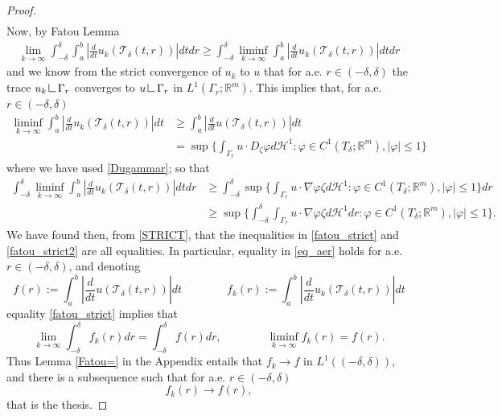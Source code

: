 \documentclass[a4paper,11pt]{article}
\numberwithin{equation}{section}
\newcommand{\R}{\mathbb{R}}
\newcommand{\res}      {\mathop{\hbox{\vrule height 7pt width .5pt depth
                        0pt\vrule height .5pt width 6pt depth 0pt}}\nolimits}
\begin{document}
\begin{proof}
\begin{align}
\end{align}
Now, by Fatou Lemma
\begin{align}\label{fatou_strict}
	\lim_{k\rightarrow \infty}\int_{-\delta}^\delta\int_{a}^b|\frac{d}{dt}u_k(\mathcal T_\delta(t,r))|dtdr\geq \int_{-\delta}^\delta\liminf_{k\rightarrow \infty}\int_{a}^b|\frac{d}{dt}u_k(\mathcal T_\delta(t,r))|dtdr
\end{align}
and we know from the strict convergence of $u_k$ to $u$ that for a.e. $r\in (-\delta,\delta)$ the trace $u_k\res\Gamma_r$ converges to $u\res\Gamma_r$ in $L^1(\Gamma_r;\R^m)$. This implies that, for a.e. $r\in (-\delta,\delta)$ 
\begin{align}\label{eq_aer}
\liminf_{k\rightarrow \infty}\int_{a}^b|\frac{d}{dt}u_k(\mathcal T_\delta(t,r))|dt&\geq \int_{a}^b|\frac{d}{dt}u(\mathcal T_\delta(t,r))|dt\nonumber\\
&=\sup\{\int_{\Gamma_r}u\cdot D_\zeta\varphi d\mathcal H^1:\varphi\in C^1(T_\delta;\R^m),|\varphi|\leq 1\}
\end{align}
where we have used \eqref{Dugammar}; so that 
\begin{align}\label{fatou_strict2}
\int_{-\delta}^\delta\liminf_{k\rightarrow \infty}\int_{a}^b|\frac{d}{dt}u_k(\mathcal T_\delta(t,r))|dtdr&\geq \int_{-\delta}^\delta \sup\{\int_{\Gamma_r}u\cdot\nabla\varphi\zeta d\mathcal H^1:\varphi\in C^1(T_\delta;\R^m),|\varphi|\leq 1\}dr\nonumber\\
&\geq \sup \{\int_{-\delta}^\delta\int_{\Gamma_r}u\cdot\nabla\varphi\zeta d\mathcal H^1dr:\varphi\in C^1(T_\delta;\R^m),|\varphi|\leq 1\}.
\end{align}
We have found then, from \eqref{STRICT}, that the inequalities in \eqref{fatou_strict}  and \eqref{fatou_strict2} are all equalities. In particular, equality in \eqref{eq_aer} holds for a.e. $r\in (-\delta,\delta)$, and denoting 
$$f(r):=\int_{a}^b|\frac{d}{dt}u(\mathcal T_\delta(t,r))|dt\qquad \qquad f_k(r):=\int_{a}^b|\frac{d}{dt}u_k(\mathcal T_\delta(t,r))|dt$$ 
equality  \eqref{fatou_strict} implies that 
$$\lim_{k\rightarrow \infty}\int_{-\delta}^\delta f_k(r)dr=\int_{-\delta}^\delta f(r)dr,\qquad \qquad \liminf_{k\rightarrow\infty} f_k(r)=f(r).$$
Thus Lemma \ref{Fatou=} in the Appendix entails that $f_k\rightarrow f$ in $L^1((-\delta,\delta))$, and there is a subsequence such that  for a.e. $r\in (-\delta,\delta)$
$$f_k(r)\rightarrow f(r),$$
that is the thesis.
\end{proof}
\end{document}
